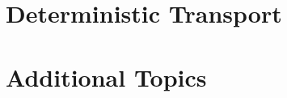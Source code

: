 \documentclass[letterpaper, 11pt, twoside, openany]{memoir}
\begin{document}
\thispagestyle{empty}
\titleTH

\frontmatter
{}
\tableofcontents*

\mainmatter 





% 
% 
% 
% 
% 
% 
% 
% 
% 
% 
% 
% 
% 
% 
% 
% 
% 
% 
% 
\part{Deterministic Transport} 









%








% 
% 
%
% 
% 


\part{Additional Topics} 
\end{document}
